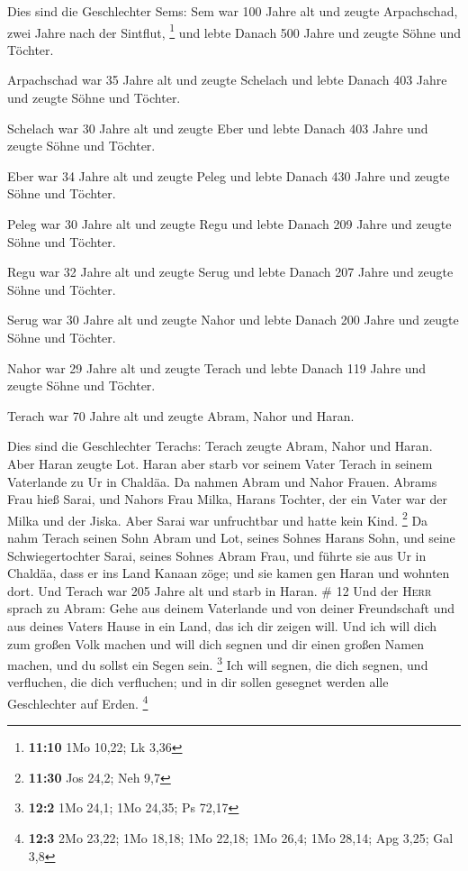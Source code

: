  Dies sind die Geschlechter Sems: Sem war 100 Jahre alt
und zeugte Arpachschad, zwei Jahre nach der Sintflut, \footnote{\textbf{11:10}
  1Mo 10,22; Lk 3,36}  und lebte Danach 500 Jahre und
zeugte Söhne und Töchter.

 Arpachschad war 35 Jahre alt und zeugte Schelach
 und lebte Danach 403 Jahre und zeugte Söhne und Töchter.

 Schelach war 30 Jahre alt und zeugte Eber
 und lebte Danach 403 Jahre und zeugte Söhne und Töchter.

 Eber war 34 Jahre alt und zeugte Peleg 
und lebte Danach 430 Jahre und zeugte Söhne und Töchter.

 Peleg war 30 Jahre alt und zeugte Regu 
und lebte Danach 209 Jahre und zeugte Söhne und Töchter.

 Regu war 32 Jahre alt und zeugte Serug 
und lebte Danach 207 Jahre und zeugte Söhne und Töchter.

 Serug war 30 Jahre alt und zeugte Nahor 
und lebte Danach 200 Jahre und zeugte Söhne und Töchter.

 Nahor war 29 Jahre alt und zeugte Terach 
und lebte Danach 119 Jahre und zeugte Söhne und Töchter.

 Terach war 70 Jahre alt und zeugte Abram, Nahor und
Haran.

 Dies sind die Geschlechter Terachs: Terach zeugte Abram,
Nahor und Haran. Aber Haran zeugte Lot.  Haran aber starb
vor seinem Vater Terach in seinem Vaterlande zu Ur in Chaldäa.
 Da nahmen Abram und Nahor Frauen. Abrams Frau hieß
Sarai, und Nahors Frau Milka, Harans Tochter, der ein Vater war der
Milka und der Jiska.  Aber Sarai war unfruchtbar und
hatte kein Kind. \footnote{\textbf{11:30} Jos 24,2; Neh 9,7}
 Da nahm Terach seinen Sohn Abram und Lot, seines Sohnes
Harans Sohn, und seine Schwiegertochter Sarai, seines Sohnes Abram Frau,
und führte sie aus Ur in Chaldäa, dass er ins Land Kanaan zöge; und sie
kamen gen Haran und wohnten dort.  Und Terach war 205
Jahre alt und starb in Haran. \# 12  Und der \textsc{Herr}
sprach zu Abram: Gehe aus deinem Vaterlande und von deiner Freundschaft
und aus deines Vaters Hause in ein Land, das ich dir zeigen will.
 Und ich will dich zum großen Volk machen und will dich
segnen und dir einen großen Namen machen, und du sollst ein Segen sein.
\footnote{\textbf{12:2} 1Mo 24,1; 1Mo 24,35; Ps 72,17} 
Ich will segnen, die dich segnen, und verfluchen, die dich verfluchen;
und in dir sollen gesegnet werden alle Geschlechter auf Erden.
\footnote{\textbf{12:3} 2Mo 23,22; 1Mo 18,18; 1Mo 22,18; 1Mo 26,4; 1Mo
  28,14; Apg 3,25; Gal 3,8}

